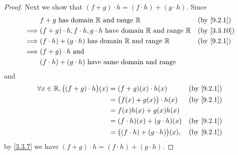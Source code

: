 \begin{proof}
  Next we show that \((f + g) \cdot h = (f \cdot h) + (g \cdot h)\).
  Since
  \begin{align*}
             & f + g \text{ has domain } \R \text{ and range } \R                                   &  & \by{9.2.1}                \\
    \implies & (f + g) \cdot h, f \cdot h, g \cdot h  \text{ have domain } \R \text{ and range } \R &  & \text{(by \cref{3.3.10})} \\
    \implies & (f \cdot h) + (g \cdot h)  \text{ has domain } \R \text{ and range } \R              &  & \by{9.2.1}                \\
    \implies & (f + g) \cdot h \text{ and }                                                                                        \\
             & (f \cdot h) + (g \cdot h) \text{ have same domain and range}
  \end{align*}
  and
  \begin{align*}
    \forall x \in \R, \big((f + g) \cdot h\big)(x) & = (f + g)(x) \cdot h(x)                   &  & \by{9.2.1} \\
                                                   & = \big(f(x) + g(x)\big) \cdot h(x)        &  & \by{9.2.1} \\
                                                   & = f(x)h(x) + g(x)h(x)                                     \\
                                                   & = (f \cdot h)(x) + (g \cdot h)(x)         &  & \by{9.2.1} \\
                                                   & = \big((f \cdot h) + (g \cdot h)\big)(x), &  & \by{9.2.1}
  \end{align*}
  by \cref{3.3.7} we have \((f + g) \cdot h = (f \cdot h) + (g \cdot h)\).


\end{proof}

